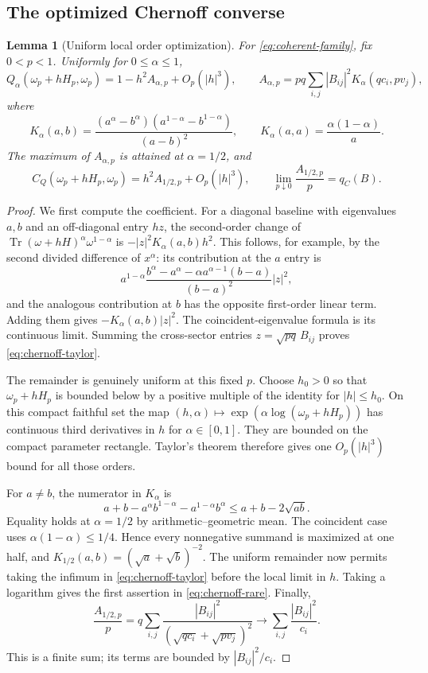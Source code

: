 \documentclass[11pt]{article}
\numberwithin{equation}{section}
\newtheorem{lemma}[theorem]{Lemma}
\theoremstyle{definition}
\theoremstyle{remark}
\DeclareMathOperator{\Tr}{Tr}
\begin{document}
\subsection{The optimized Chernoff converse}

\begin{lemma}[Uniform local order optimization]
\label{lem:chernoff-local}
For \eqref{eq:coherent-family}, fix $0<p<1$. Uniformly for
$0\leq\alpha\leq1$,
\begin{equation}
 Q_\alpha(\omega_p+hH_p,\omega_p)
   =1-h^2 A_{\alpha,p}+O_p(|h|^3),
 \qquad
 A_{\alpha,p}=pq\sum_{i,j}|B_{ij}|^2
 K_\alpha(qc_i,pv_j),
 \label{eq:chernoff-taylor}
\end{equation}
where
\[
 K_\alpha(a,b)=
 \frac{(a^\alpha-b^\alpha)(a^{1-\alpha}-b^{1-\alpha})}
      {(a-b)^2},
 \qquad K_\alpha(a,a)=\frac{\alpha(1-\alpha)}a.
\]
The maximum of $A_{\alpha,p}$ is attained at $\alpha=1/2$, and
\begin{equation}
 C_Q(\omega_p+hH_p,\omega_p)
 =h^2A_{1/2,p}+O_p(|h|^3),\qquad
 \lim_{p\downarrow0}\frac{A_{1/2,p}}p=q_C(B).
 \label{eq:chernoff-rare}
\end{equation}
\end{lemma}
\begin{proof}
We first compute the coefficient. For a diagonal baseline with eigenvalues
$a,b$ and an off-diagonal entry $h z$, the second-order change of
$\Tr(\omega+hH)^\alpha\omega^{1-\alpha}$ is
$-|z|^2K_\alpha(a,b)h^2$. This follows, for example, by the
second divided difference of $x^\alpha$: its contribution at the $a$
entry is
\[
 a^{1-\alpha}\frac{b^\alpha-a^\alpha-\alpha a^{\alpha-1}(b-a)}
                         {(b-a)^2}|z|^2,
\]
and the analogous contribution at $b$ has the opposite first-order
linear term. Adding them gives $-K_\alpha(a,b)|z|^2$.
The coincident-eigenvalue formula is its continuous limit.
Summing the cross-sector entries
$z=\sqrt{pq}\,B_{ij}$ proves \eqref{eq:chernoff-taylor}.

The remainder is genuinely uniform at this fixed $p$.
Choose $h_0>0$ so that $\omega_p+hH_p$ is bounded below by a positive
multiple of the identity for $|h|\leq h_0$. On this compact faithful
set the map
$(h,\alpha)\mapsto \exp(\alpha\log(\omega_p+hH_p))$
has continuous third derivatives in $h$ for $\alpha\in[0,1]$.
They are bounded on the compact parameter rectangle. Taylor's theorem
therefore gives one $O_p(|h|^3)$ bound for all those orders.

For $a\ne b$, the numerator in $K_\alpha$ is
\[
 a+b-a^\alpha b^{1-\alpha}-a^{1-\alpha}b^\alpha
 \leq a+b-2\sqrt{ab}.
\]
Equality holds at $\alpha=1/2$ by arithmetic--geometric mean.
The coincident case uses $\alpha(1-\alpha)\leq1/4$.
Hence every nonnegative summand is maximized at one half, and
$K_{1/2}(a,b)=(\sqrt a+\sqrt b)^{-2}$.
The uniform remainder now permits taking the infimum in
\eqref{eq:chernoff-taylor} before the local limit in $h$.
Taking a logarithm gives the first assertion in \eqref{eq:chernoff-rare}.
Finally,
\[
 \frac{A_{1/2,p}}p
 =q\sum_{i,j}\frac{|B_{ij}|^2}
                   {(\sqrt{qc_i}+\sqrt{pv_j})^2}
 \longrightarrow\sum_{i,j}\frac{|B_{ij}|^2}{c_i}.
\]
This is a finite sum; its terms are bounded by $|B_{ij}|^2/c_i$.
\end{proof}
\end{document}
